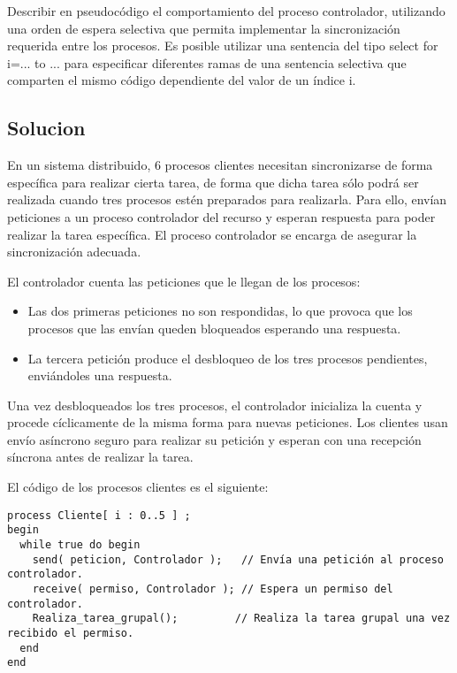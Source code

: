 \documentclass[a4paper,12pt]{article}
\begin{document}
Describir en pseudocódigo el comportamiento del proceso controlador, utilizando una orden de
espera selectiva que permita implementar la sincronización requerida entre los procesos. Es
posible utilizar una sentencia del tipo select for i=... to ... para especificar diferentes ramas de una sentencia selectiva que comparten el mismo código dependiente del valor
de un índice i.

\subsection{Solucion}

En un sistema distribuido, 6 procesos clientes necesitan sincronizarse de forma específica para realizar cierta tarea, de forma que dicha tarea sólo podrá ser realizada cuando tres procesos estén preparados para realizarla. Para ello, envían peticiones a un proceso controlador del recurso y esperan respuesta para poder realizar la tarea específica. El proceso controlador se encarga de asegurar la sincronización adecuada. 

El controlador cuenta las peticiones que le llegan de los procesos:
\begin{itemize}
    \item Las dos primeras peticiones no son respondidas, lo que provoca que los procesos que las envían queden bloqueados esperando una respuesta.
    \item La tercera petición produce el desbloqueo de los tres procesos pendientes, enviándoles una respuesta.
\end{itemize}

Una vez desbloqueados los tres procesos, el controlador inicializa la cuenta y procede cíclicamente de la misma forma para nuevas peticiones. Los clientes usan envío asíncrono seguro para realizar su petición y esperan con una recepción síncrona antes de realizar la tarea.

El código de los procesos clientes es el siguiente:

\begin{lstlisting}[style=customcpp, caption={Código de los procesos clientes}]
process Cliente[ i : 0..5 ] ;
begin
  while true do begin
    send( peticion, Controlador );   // Envía una petición al proceso controlador.
    receive( permiso, Controlador ); // Espera un permiso del controlador.
    Realiza_tarea_grupal();         // Realiza la tarea grupal una vez recibido el permiso.
  end
end
\end{lstlisting}
\end{document}
